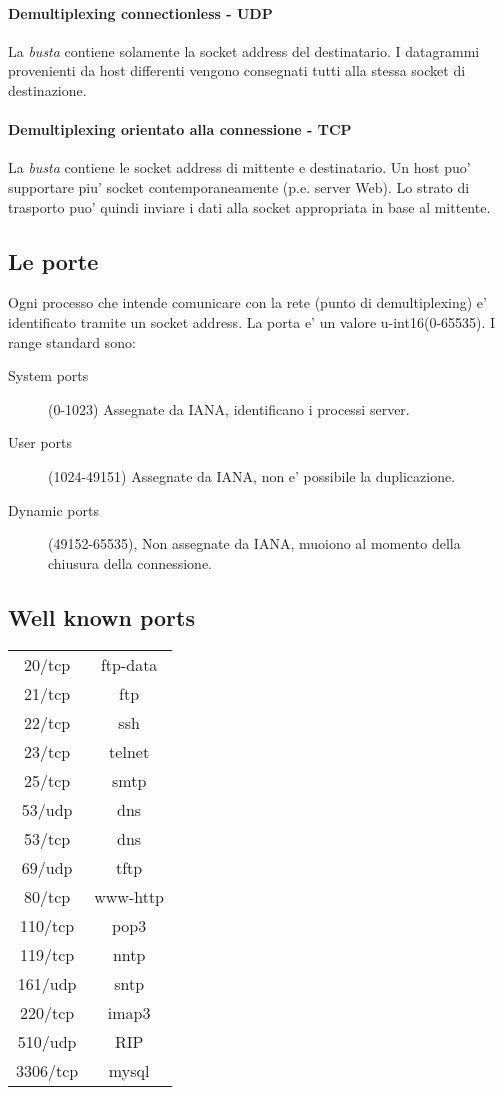 \paragraph{Demultiplexing connectionless - UDP}
La \textit{busta} contiene solamente la socket address del destinatario. I datagrammi provenienti da host differenti vengono consegnati tutti alla stessa socket di destinazione.
\paragraph{Demultiplexing orientato alla connessione - TCP}
La \textit{busta} contiene le socket address di mittente e destinatario. Un host puo' supportare piu' socket contemporaneamente (p.e. server Web). Lo strato di trasporto puo' quindi inviare i dati alla socket appropriata in base al mittente.
\subsection{Le porte}
Ogni processo che intende comunicare con la rete (punto di demultiplexing) e' identificato tramite un socket address.
La {\color{blue}porta} e' un valore u-int16(0-65535). 
I range standard sono:
\begin{description}
    \item[System ports] (0-1023) Assegnate da IANA, identificano i processi server.
    \item[User ports] (1024-49151) Assegnate da IANA, non e' possibile la duplicazione.
    \item[Dynamic ports] (49152-65535), Non assegnate da IANA, muoiono al momento della chiusura della connessione.
\end{description}
\subsection{Well known ports}
\begin{tabular}{c c}
        20/tcp & ftp-data \\
        21/tcp & ftp \\
        22/tcp & ssh \\
        23/tcp & telnet \\
        25/tcp & smtp \\
        53/udp & dns \\
        53/tcp & dns \\
        69/udp & tftp \\
        80/tcp & www-http \\
        110/tcp & pop3 \\
        119/tcp & nntp \\
        161/udp & sntp \\
        220/tcp & imap3 \\
        510/udp & RIP \\
        3306/tcp & mysql
\end{tabular}